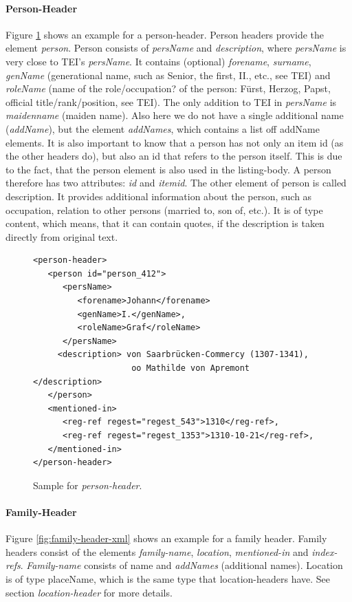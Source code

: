 \paragraph{Person-Header}
Figure \ref{fig:person-header-xml} shows an example for a person-header. Person headers provide the element \textit{person}. Person consists of \textit{persName} and \textit{description}, where \textit{persName} is very close to TEI's \textit{persName}. It contains (optional) \textit{forename}, \textit{surname}, \textit{genName} (generational name, such as Senior, the first, II., etc., see TEI) and \textit{roleName} (name of the role/occupation? of the person: Fürst, Herzog, Papst, official title/rank/position, see TEI). The only addition to TEI in \textit{persName} is \textit{maidenname} (maiden name). Also here we do not have a single additional name (\textit{addName}), but the element \textit{addNames}, which contains a list off addName elements. It is also important to know that a person has not only an item id (as the other headers do), but also an id that refers to the person itself. This is due to the fact, that the person element is also used in the listing-body. A person therefore has two attributes: \textit{id} and \textit{itemid}.
The other element of person is called description. It provides additional information about the person, such as occupation, relation to other persons (married to, son of, etc.). It is of type content, which means, that it can contain quotes, if the description is taken directly from original text.

\begin{figure}[H]
\begin{verbatim}
<person-header>
   <person id="person_412">
      <persName>
         <forename>Johann</forename> 
         <genName>I.</genName>, 
         <roleName>Graf</roleName>
      </persName>
     <description> von Saarbrücken-Commercy (1307-1341), 
                    oo Mathilde von Apremont    </description>
   </person>
   <mentioned-in>
      <reg-ref regest="regest_543">1310</reg-ref>, 
      <reg-ref regest="regest_1353">1310-10-21</reg-ref>, 
   </mentioned-in>
</person-header>
\end{verbatim}
\label{fig:person-header-xml}
\caption{Sample for \textit{person-header}.}
\end{figure}

\paragraph{Family-Header}
Figure \ref{fig:family-header-xml} shows an example for a family header. Family headers consist of the elements \textit{family-name}, \textit{location}, \textit{mentioned-in} and \textit{index-refs}. \textit{Family-name} consists of name and \textit{addNames} (additional names). Location is of type placeName, which is the same type that location-headers have. See section \textit{location-header} for more details.


